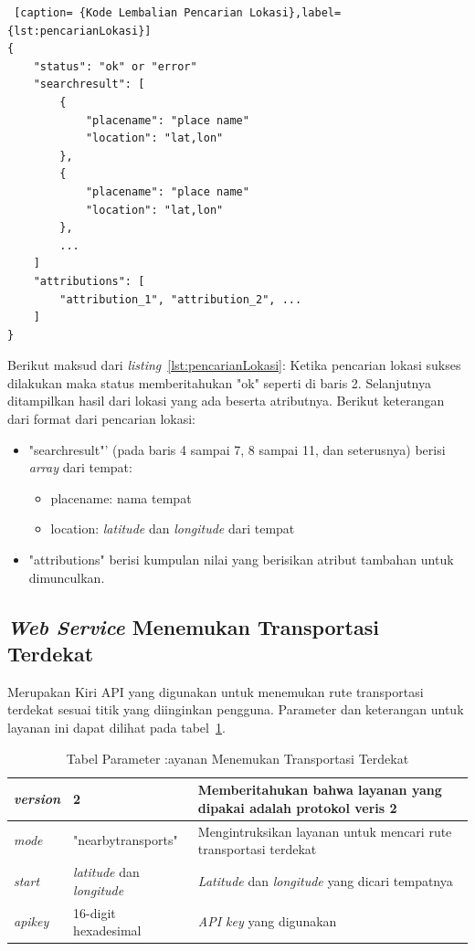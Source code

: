 \begin{lstlisting} [caption= {Kode Lembalian Pencarian Lokasi},label={lst:pencarianLokasi}]
{
    "status": "ok" or "error"
    "searchresult": [
        {
            "placename": "place name"
            "location": "lat,lon"
        },
        {
            "placename": "place name"
            "location": "lat,lon"
        },
        ...
    ]
    "attributions": [
        "attribution_1", "attribution_2", ...
    ]
}
\end{lstlisting}
Berikut maksud dari \textit{listing}~\ref{lst:pencarianLokasi}: 
\newline
\hspace{0.5cm} Ketika pencarian lokasi sukses dilakukan maka status memberitahukan "ok" seperti di baris 2. Selanjutnya ditampilkan hasil dari lokasi yang ada beserta atributnya. Berikut keterangan dari format dari pencarian lokasi:
\begin{itemize}
	\item "searchresult"' (pada baris 4 sampai 7, 8 sampai 11, dan seterusnya) berisi \textit{array} dari tempat:
	\begin{itemize}
		\item placename: nama tempat
		\item location: \textit{latitude} dan \textit{longitude} dari tempat
	\end{itemize}
	\item "attributions" berisi kumpulan nilai yang berisikan atribut tambahan untuk dimunculkan.
\end{itemize}	

\subsection{\textit{Web Service} Menemukan Transportasi Terdekat}
\label{subsec:Service Menemukan Transportasi Terdekat}
\hspace{0.5cm} Merupakan Kiri API yang digunakan untuk menemukan rute transportasi terdekat sesuai titik yang diinginkan pengguna. Parameter dan keterangan untuk layanan ini dapat dilihat pada tabel~\ref{tab:transportasiTerdekat}.

\begin{table}[H]
	\centering
		\begin{tabular}{ |p{2cm}|p{4cm}|p{8cm}| }
			\hline
			\textit{version} & 2 &  Memberitahukan bahwa layanan yang dipakai adalah protokol veris 2 \\ \hline
			\textit{mode} & "nearbytransports" & Mengintruksikan layanan untuk mencari rute transportasi terdekat \\ \hline
			\textit{start} & \textit{latitude} dan \textit{longitude} & \textit{Latitude} dan \textit{longitude} yang dicari tempatnya \\ \hline
			\textit{apikey} & 16-digit hexadesimal & \textit{API key} yang digunakan \\ \hline
			\hline
		\end{tabular}
	\caption{Tabel Parameter :ayanan Menemukan Transportasi Terdekat}
	\label{tab:transportasiTerdekat}
\end{table}


